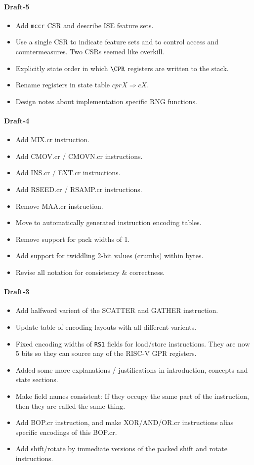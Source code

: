 \paragraph{Draft-5}
\begin{itemize}
\item Add {\tt mccr} CSR and describe ISE feature sets.
\item Use a single CSR to indicate feature sets and to control
    access and countermeasures. Two CSRs seemed like overkill.
\item Explicitly state order in which $\CPR$ registers are written to 
    the stack.
\item Rename registers in state table $cprX \Rightarrow cX$.
\item Design notes about implementation specific RNG functions.
\end{itemize}

\paragraph{Draft-4}
\begin{itemize}
\item Add MIX.cr instruction.
\item Add CMOV.cr / CMOVN.cr instructions.
\item Add INS.cr / EXT.cr instructions.
\item Add RSEED.cr / RSAMP.cr instructions.
\item Remove MAA.cr instruction.
\item Move to automatically generated instruction encoding tables.
\item Remove support for pack widths of 1.
\item Add support for twiddling 2-bit values (crumbs) within bytes.
\item Revise all notation for consistency \& correctness.
\end{itemize}

\paragraph{Draft-3}
\begin{itemize}
\item Add halfword varient of the SCATTER and GATHER instruction.
\item Update table of encoding layouts with all different varients.
\item Fixed encoding widths of {\tt RS1} fields for load/store
    instructions. They are now 5 bits so they can source any of the
    RISC-V GPR registers.
\item Added some more explanations / justifications in introduction,
    concepts and state sections.
\item Make field names consistent: If they occupy the same part of
    the instruction, then they are called the same thing.
\item Add BOP.cr instruction, and make XOR/AND/OR.cr instructions
    alias specific encodings of this BOP.cr.
\item Add shift/rotate by immediate versions of the packed
    shift and rotate instructions.
\end{itemize}

